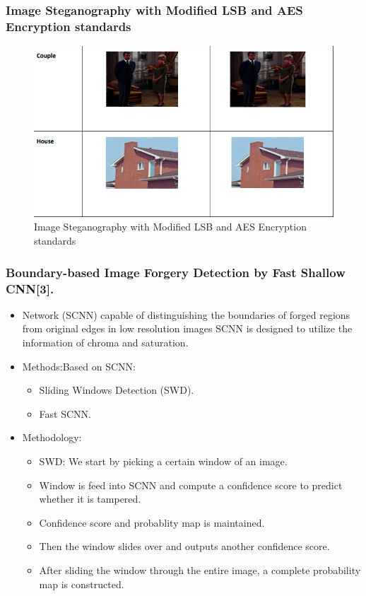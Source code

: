 \documentclass{beamer} %
\theoremstyle{definition} %
\begin{document}
\begin{frame}
 \frametitle{Image Steganography with Modified LSB and AES Encryption standards}
	\begin{figure}
		\includegraphics[scale=0.45]{modifiedLSB.png}
		\caption{Image Steganography with Modified LSB and AES Encryption standards}
	\end{figure}
\end{frame}

\begin{frame}
\frametitle{Boundary-based Image Forgery Detection by Fast Shallow CNN[3].  }
\begin{itemize}
	\item{ Network (SCNN) capable of distinguishing the boundaries of
		forged regions from original edges in low resolution images 
		SCNN is designed to utilize the information of chroma and
		saturation.}
	\item{Methods:Based on SCNN:}
	\begin{itemize}
		\item Sliding Windows Detection (SWD).
		\item Fast SCNN.
	\end{itemize}
	\item {Methodology:}
	\begin{itemize}
		\item{SWD: We start by picking a certain window of an image.}
		\item Window is feed into SCNN and compute a confidence score to predict whether it is tampered. 
		\item Confidence score and probablity map is maintained.   
		\item Then the window slides over and outputs another confidence score. 
		\item After sliding the window through the entire image, a complete probability map is constructed.
    \end{itemize}
\end{itemize}
\end{frame}
\end{document}
